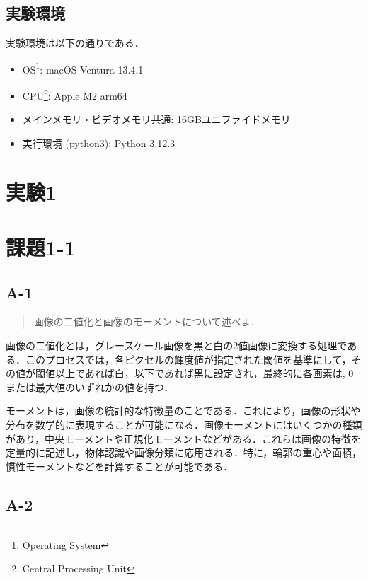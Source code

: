 \documentclass[fleqn, a4paper. 12pt]{jsarticle}
\begin{document}
  \subsection*{実験環境}

    実験環境は以下の通りである．

    \begin{itemize}
      \item OS\footnote{Operating System}: macOS Ventura 13.4.1
      \item CPU\footnote{Central Processing Unit}: Apple M2 arm64\footnotemark[4]
      \item メインメモリ・ビデオメモリ共通: 16GBユニファイドメモリ\footnotemark[4]
      \item 実行環境 (python3): Python 3.12.3
    \end{itemize}

  \newpage

  \section*{実験1}

  \section*{課題1-1}

    \subsection*{A-1}

      \begin{quote}
        画像の二値化と画像のモーメントについて述べよ.
      \end{quote}

      画像の二値化とは，グレースケール画像を黒と白の2値画像に変換する処理である．このプロセスでは，各ピクセルの輝度値が指定された閾値を基準にして，その値が閾値以上であれば白，以下であれば黒に設定され，最終的に各画素は, 0 または最大値のいずれかの値を持つ．

      モーメントは，画像の統計的な特徴量のことである．これにより，画像の形状や分布を数学的に表現することが可能になる．画像モーメントにはいくつかの種類があり，中央モーメントや正規化モーメントなどがある．これらは画像の特徴を定量的に記述し，物体認識や画像分類に応用される．特に，輪郭の重心や面積，慣性モーメントなどを計算することが可能である．

    \subsection*{A-2}
\end{document}
